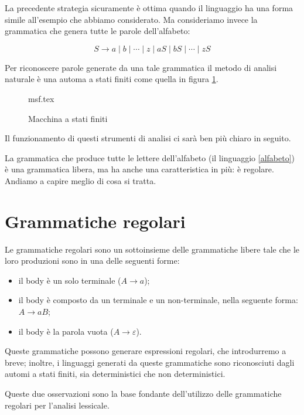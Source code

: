 \documentclass[class=book, crop=false, oneside, 12pt]{standalone}
\begin{document}
La precedente strategia sicuramente è ottima quando il linguaggio ha una forma simile all'esempio che abbiamo considerato. Ma consideriamo invece la grammatica che genera tutte le parole dell’alfabeto:

\begin{equation}
    \label{alfabeto}
    S \to a \mid b \mid \cdots \mid z \mid aS \mid bS \mid \cdots \mid zS
\end{equation}

Per riconoscere parole generate da una tale grammatica il metodo di analisi naturale è una automa a stati finiti come quella in figura \ref{macchina_a_stati_finiti}.

\begin{figure}[H]
	\centering
	{msf.tex}
    \caption{Macchina a stati finiti}
	\label{macchina_a_stati_finiti}
\end{figure}

\noindent Il funzionamento di questi strumenti di analisi ci sarà ben più chiaro in seguito.

La grammatica che produce tutte le lettere dell’alfabeto (il linguaggio \ref{alfabeto}) è una grammatica libera, ma ha anche una caratteristica in più: è regolare. Andiamo a capire meglio di cosa si tratta.


\section{Grammatiche regolari}

Le grammatiche regolari sono un sottoinsieme delle grammatiche libere tale che le loro produzioni sono in una delle seguenti forme:

\begin{itemize}
    \item il body è un solo terminale (\(A \to a\));
    \item il body è composto da un terminale e un non-terminale, nella seguente forma: \(A \to aB\);  
    \item il body è la parola vuota (\(A \to \varepsilon\)).
\end{itemize}

Queste grammatiche possono generare espressioni regolari, che introdurremo a breve; inoltre, i linguaggi generati da queste grammatiche sono riconosciuti dagli automi a stati finiti, sia deterministici che non deterministici.

Queste due osservazioni sono la base fondante dell'utilizzo delle grammatiche regolari per l’analisi lessicale.
\end{document}
